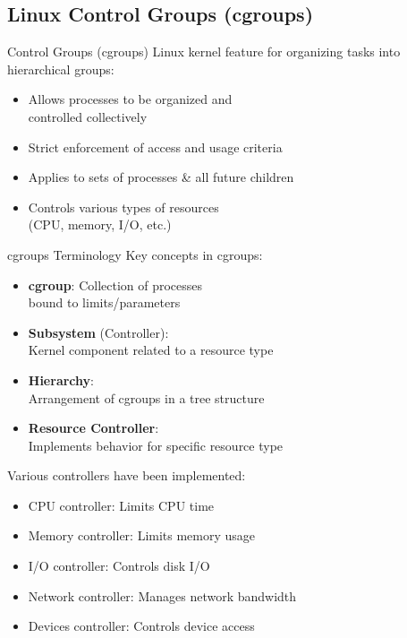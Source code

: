 \multend

\subsection{Linux Control Groups (cgroups)}


\begin{definition}{Control Groups (cgroups)}
    Linux kernel feature for organizing tasks into hierarchical groups:
    \begin{itemize}
        \item Allows processes to be organized and \\ controlled collectively
        \item Strict enforcement of access and usage criteria
        \item Applies to sets of processes \& all future children
        \item Controls various types of resources \\ (CPU, memory, I/O, etc.)
    \end{itemize}
\end{definition}

\begin{theorem}{cgroups Terminology}
    Key concepts in cgroups:
    \begin{itemize}
        \item \textbf{cgroup}: Collection of processes\\ bound to limits/parameters
        \item \textbf{Subsystem} (Controller): \\Kernel component related to a resource type
        \item \textbf{Hierarchy}: \\ Arrangement of cgroups in a tree structure
        \item \textbf{Resource Controller}: \\ Implements behavior for specific resource type
    \end{itemize}
    
    Various controllers have been implemented:
    \begin{itemize}
        \item CPU controller: Limits CPU time
        \item Memory controller: Limits memory usage
        \item I/O controller: Controls disk I/O
        \item Network controller: Manages network bandwidth
        \item Devices controller: Controls device access
    \end{itemize}
\end{theorem}

